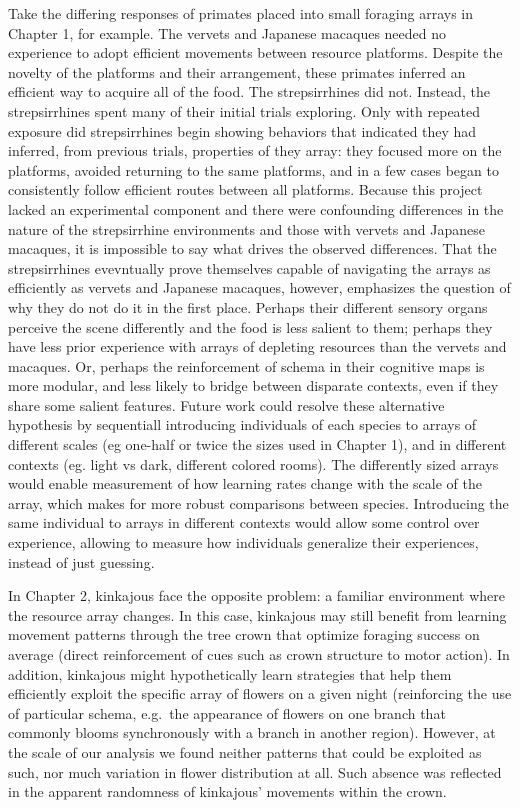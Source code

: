 \documentclass[twoside,12pt,final]{ucthesis-CA2012}
\begin{document}
\begin{ucmainmatter}
Take the differing responses of primates placed into small foraging arrays in Chapter 1, for example. The vervets and Japanese macaques needed no experience to adopt efficient movements between resource platforms. Despite the novelty of the platforms and their arrangement, these primates inferred an efficient way to acquire all of the food. The strepsirrhines did not. Instead, the strepsirrhines spent many of their initial trials exploring. Only with repeated exposure did strepsirrhines begin showing behaviors that indicated they had inferred, from previous trials, properties of they array: they focused more on the platforms, avoided returning to the same platforms, and in a few cases began to consistently follow efficient routes between all platforms. Because this project lacked an experimental component and there were confounding differences in the nature of the strepsirrhine environments and those with vervets and Japanese macaques, it is impossible to say what drives the observed differences. That the strepsirrhines evevntually prove themselves capable of navigating the arrays as efficiently as vervets and Japanese macaques, however, emphasizes the question of why they do not do it in the first place. Perhaps their different sensory organs perceive the scene differently and the food is less salient to them; perhaps they have less prior experience with arrays of depleting resources than the vervets and macaques. Or, perhaps the reinforcement of schema in their cognitive maps is more modular, and less likely to bridge between disparate contexts, even if they share some salient features. Future work could resolve these alternative hypothesis by sequentiall introducing individuals of each species to arrays of different scales (eg one-half or twice the sizes used in Chapter 1), and in different contexts (eg. light vs dark, different colored rooms). The differently sized arrays would enable measurement of how learning rates change with the scale of the array, which makes for more robust comparisons between species. Introducing the same individual to arrays in different contexts would allow some control over experience, allowing to measure how individuals generalize their experiences, instead of just guessing.

In Chapter 2, kinkajous face the opposite problem: a familiar environment where the resource array changes. In this case, kinkajous may still benefit from learning movement patterns through the tree crown that optimize foraging success on average (direct reinforcement of cues such as crown structure to motor action). In addition, kinkajous might hypothetically learn strategies that help them efficiently exploit the specific array of flowers on a given night (reinforcing the use of particular schema, e.g.~the appearance of flowers on one branch that commonly blooms synchronously with a branch in another region). However, at the scale of our analysis we found neither patterns that could be exploited as such, nor much variation in flower distribution at all. Such absence was reflected in the apparent randomness of kinkajous' movements within the crown.


\end{ucmainmatter}
\end{document}
